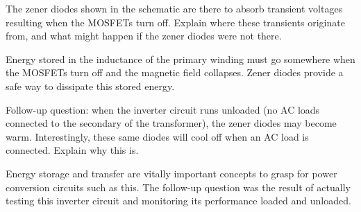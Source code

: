 

The zener diodes shown in the schematic are there to absorb transient voltages resulting when the MOSFETs turn off.  Explain where these transients originate from, and what might happen if the zener diodes were not there.







Energy stored in the inductance of the primary winding must go somewhere when the MOSFETs turn off and the magnetic field collapses.  Zener diodes provide a safe way to dissipate this stored energy.

\vskip 10pt

Follow-up question: when the inverter circuit runs unloaded (no AC loads connected to the secondary of the transformer), the zener diodes may become warm.  Interestingly, these same diodes will cool off when an AC load is connected.  Explain why this is.







Energy storage and transfer are vitally important concepts to grasp for power conversion circuits such as this.  The follow-up question was the result of actually testing this inverter circuit and monitoring its performance loaded and unloaded.




